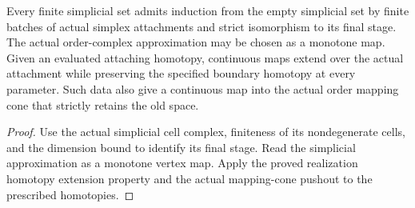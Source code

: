 \begin{proposition}
  \label{prop:actual-finite-cell-order-gluing}
  \leanok
  Every finite simplicial set admits induction from the empty simplicial set by finite batches of actual simplex attachments and strict isomorphism to its final stage. The actual order-complex approximation may be chosen as a monotone map. Given an evaluated attaching homotopy, continuous maps extend over the actual attachment while preserving the specified boundary homotopy at every parameter. Such data also give a continuous map into the actual order mapping cone that strictly retains the old space.
\end{proposition}
\begin{proof}
  Use the actual simplicial cell complex, finiteness of its nondegenerate cells, and the dimension bound to identify its final stage. Read the simplicial approximation as a monotone vertex map. Apply the proved realization homotopy extension property and the actual mapping-cone pushout to the prescribed homotopies.
  \leanok
\end{proof}

